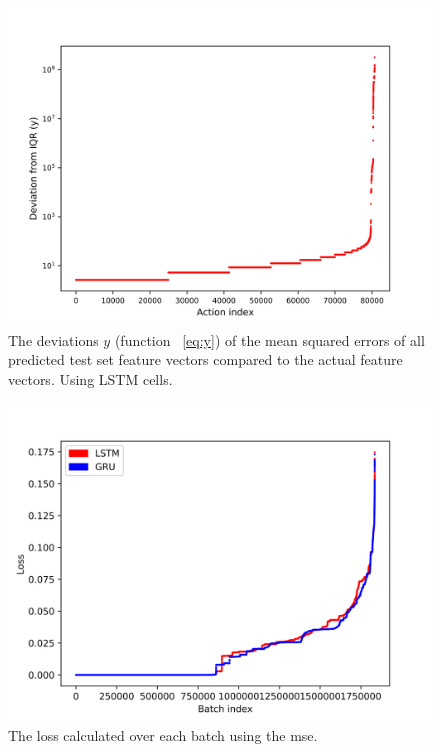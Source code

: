 \begin{figure}
	\begin{center}
		\includegraphics[scale=6.0]{experiments/cell/deviations/lstm}
	\end{center}
	\caption{The deviations \(y\) (function ~\ref{eq:y}) of the mean squared errors of all predicted test set feature vectors compared to the actual feature vectors. Using LSTM cells.~\label{fig:lstm_deviations}}
\end{figure}

\begin{figure}
	\begin{center}
		\includegraphics[scale=6.0]{experiments/cell/losses/comparison}
	\end{center}
	\caption{The loss calculated over each batch using the mse.~\label{fig:gru_rnn_losses}}
\end{figure}

